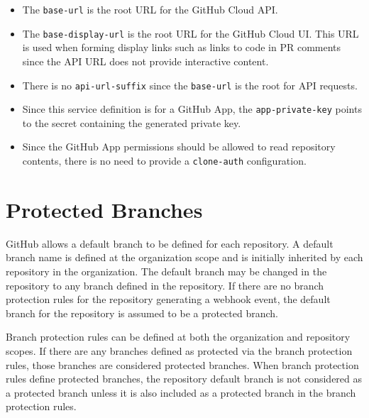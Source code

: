 \begin{itemize}
    \item The \texttt{base-url} is the root URL for the GitHub Cloud API.
    \item The \texttt{base-display-url} is the root URL for the GitHub Cloud UI. This URL is used
    when forming display links such as links to code in PR comments since the API URL does not
    provide interactive content.
    \item There is no \texttt{api-url-suffix} since the \texttt{base-url} is the root for API requests.
    \item Since this service definition is for a GitHub App, the \texttt{app-private-key} points to the secret
    containing the generated private key.
    \item Since the GitHub App permissions should be allowed to read repository contents, there is no need
    to provide a \texttt{clone-auth} configuration.
\end{itemize}



\section{Protected Branches}

GitHub allows a default branch to be defined for each repository.  A default branch name is defined at the organization
scope and is initially inherited by each repository in the organization.  The default branch may be changed in the repository
to any branch defined in the repository. If there are no branch protection rules for the repository generating a webhook event, 
the default branch for the repository is assumed to be a protected branch.

Branch protection rules can be defined at both the organization and repository scopes.  If there are any branches
defined as protected via the branch protection rules, those branches are considered protected branches.  When branch protection
rules define protected branches, the repository default branch is not considered as a protected branch unless it is also included
as a protected branch in the branch protection rules.
